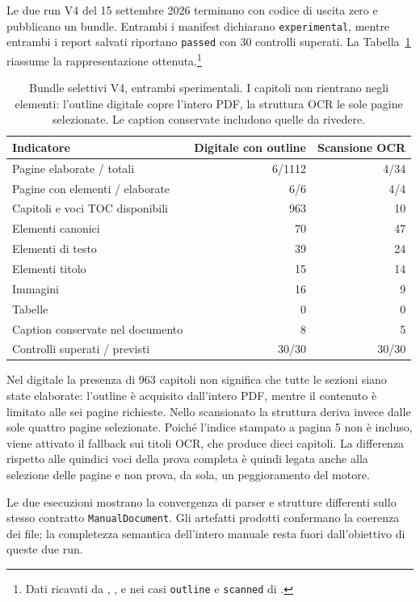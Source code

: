 Le due run V4 del 15 settembre 2026 terminano con codice di uscita zero e pubblicano un bundle. Entrambi i manifest dichiarano \texttt{experimental}, mentre entrambi i report salvati riportano \texttt{passed} con 30 controlli superati. La Tabella~\ref{tab:risultati-v4} riassume la rappresentazione ottenuta.\footnote{Dati ricavati da , ,  e  nei casi \texttt{outline} e \texttt{scanned} di .}

\begin{table}[!htbp]
\centering
\caption{Bundle selettivi V4, entrambi sperimentali. I capitoli non rientrano negli elementi: l'outline digitale copre l'intero PDF, la struttura OCR le sole pagine selezionate. Le caption conservate includono quelle da rivedere.}
\label{tab:risultati-v4}
\small
\begin{tabularx}{\textwidth}{@{}Xrr@{}}
\toprule
Indicatore & Digitale con outline & Scansione OCR \\
\midrule
Pagine elaborate / totali & 6/1112 & 4/34 \\
Pagine con elementi / elaborate & 6/6 & 4/4 \tabularnewline
Capitoli e voci TOC disponibili & 963 & 10 \tabularnewline
Elementi canonici & 70 & 47 \\
Elementi di testo & 39 & 24 \\
Elementi titolo & 15 & 14 \\
Immagini & 16 & 9 \\
Tabelle & 0 & 0 \\
Caption conservate nel documento & 8 & 5 \\
Controlli superati / previsti & 30/30 & 30/30 \tabularnewline
\bottomrule
\end{tabularx}
\end{table}

Nel digitale la presenza di 963 capitoli non significa che tutte le sezioni siano state elaborate: l'outline è acquisito dall'intero PDF, mentre il contenuto è limitato alle sei pagine richieste. Nello scansionato la struttura deriva invece dalle sole quattro pagine selezionate. Poiché l'indice stampato a pagina 5 non è incluso, viene attivato il fallback sui titoli OCR, che produce dieci capitoli. La differenza rispetto alle quindici voci della prova completa è quindi legata anche alla selezione delle pagine e non prova, da sola, un peggioramento del motore.

Le due esecuzioni mostrano la convergenza di parser e strutture differenti sullo stesso contratto \texttt{ManualDocument}. Gli artefatti prodotti confermano la coerenza dei file; la completezza semantica dell'intero manuale resta fuori dall'obiettivo di queste due run.

